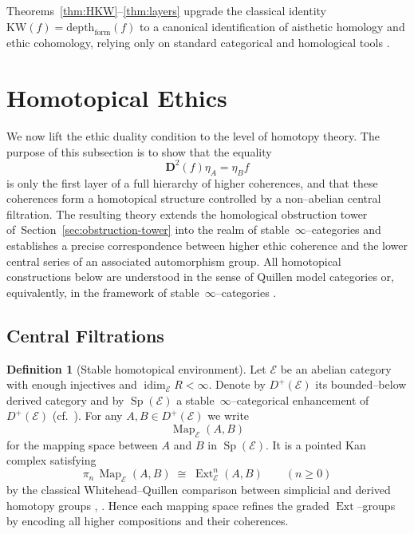 \documentclass[12pt]{article}
\DeclareMathOperator{\Map}{Map}
\DeclareMathOperator{\Sp}{Sp}
\newcommand{\idim}{\operatorname{idim}}
\newcommand{\E}{\mathcal{E}}
\newcommand{\Ext}{\operatorname{Ext}}
\theoremstyle{plain}
\theoremstyle{definition}
\newtheorem{definition}[theorem]{Definition}
\theoremstyle{remark}
\numberwithin{equation}{section}
\begin{document}
\noindent Theorems~\ref{thm:HKW}--\ref{thm:layers} upgrade the classical identity $\mathrm{KW}(f)=\mathrm{depth}_{\mathrm{form}}(f)$ \cite{KarchmerWigderson1990} to a canonical identification of aisthetic homology and ethic cohomology, relying only on standard categorical and homological tools \cite{MacLane1998,Kelly1982,Weibel1994,LeinsterBasic}.

\section{Homotopical Ethics}

We now lift the ethic duality condition to the level of homotopy theory.  
The purpose of this subsection is to show that the equality
\[
\mathbf D^2(f)\eta_A=\eta_B f
\]
is only the first layer of a full hierarchy of higher coherences, and that these coherences form a homotopical structure controlled by a non–abelian central filtration.  
The resulting theory extends the homological obstruction tower of~Section~\ref{sec:obstruction-tower} into the realm of stable~$\infty$--categories and establishes a precise correspondence between higher ethic coherence and the lower central series of an associated automorphism group. 
All homotopical constructions below are understood in the sense of Quillen model categories \cite{Quillen1967} or, equivalently, in the framework of stable~$\infty$--categories \cite{LurieHA}.

\subsection{Central Filtrations}

\begin{definition}[Stable homotopical environment]
Let $\E$ be an abelian category with enough injectives and $\idim_\E R<\infty$.  
Denote by $D^+(\E)$ its bounded--below derived category and by $\Sp(\E)$ a stable~$\infty$--categorical enhancement of~$D^+(\E)$ (cf.~\cite{LurieHA}).  
For any $A,B\in D^+(\E)$ we write
\[
\Map_\E(A,B)
\]
for the mapping space between $A$ and $B$ in $\Sp(\E)$.  
It is a pointed Kan complex satisfying
\[
\pi_n\,\Map_\E(A,B)\;\cong\;\Ext^n_\E(A,B)
\qquad (n\ge 0)
\]
by the classical Whitehead--Quillen comparison between simplicial and derived homotopy groups 
\cite{Whitehead1949}, \cite{Quillen1967}.  
Hence each mapping space refines the graded $\Ext$--groups by encoding all higher compositions and their coherences.
\end{definition}
\end{document}
